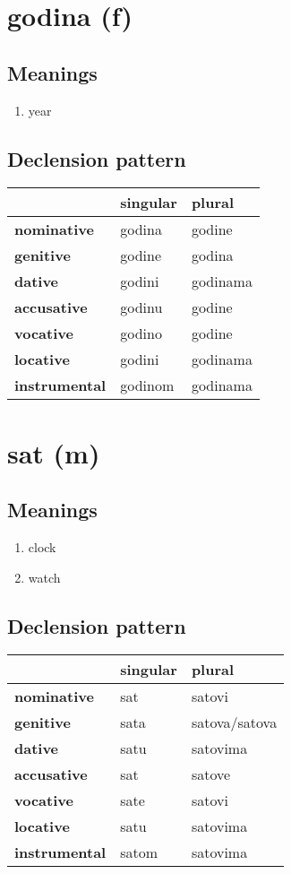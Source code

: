 \filbreak
\section{godina (f)}
\subsection*{Meanings}
\begin{enumerate}
\item year
\end{enumerate}
\subsection*{Declension pattern}
\begin{tabularx}{\linewidth}{Xll}
\toprule
{} & singular &    plural \\
\midrule
\textbf{nominative  } &   godina &    godine \\
\textbf{genitive    } &   godine &    godina \\
\textbf{dative      } &   godini &  godinama \\
\textbf{accusative  } &   godinu &    godine \\
\textbf{vocative    } &   godino &    godine \\
\textbf{locative    } &   godini &  godinama \\
\textbf{instrumental} &  godinom &  godinama \\
\bottomrule
\end{tabularx}

\filbreak
\section{sat (m)}
\subsection*{Meanings}
\begin{enumerate}
\item clock
\item watch
\end{enumerate}
\subsection*{Declension pattern}
\begin{tabularx}{\linewidth}{Xll}
\toprule
{} & singular &           plural \\
\midrule
\textbf{nominative  } &      sat &          satovi \\
\textbf{genitive    } &     sata &  satova/satova \\
\textbf{dative      } &     satu &        satovima \\
\textbf{accusative  } &      sat &          satove \\
\textbf{vocative    } &     sate &          satovi \\
\textbf{locative    } &     satu &        satovima \\
\textbf{instrumental} &    satom &        satovima \\
\bottomrule
\end{tabularx}

